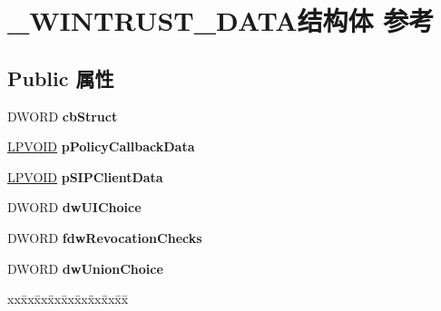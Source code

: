 \hypertarget{struct___w_i_n_t_r_u_s_t___d_a_t_a}{}\section{\+\_\+\+W\+I\+N\+T\+R\+U\+S\+T\+\_\+\+D\+A\+T\+A结构体 参考}
\label{struct___w_i_n_t_r_u_s_t___d_a_t_a}
\subsection*{Public 属性}
\begin{DoxyCompactItemize}
\item 
\mbox{\label{struct___w_i_n_t_r_u_s_t___d_a_t_a_ab690db7308bd57b7aed8d38be6d306ad}} 
D\+W\+O\+RD {\bfseries cb\+Struct}
\item 
\mbox{\label{struct___w_i_n_t_r_u_s_t___d_a_t_a_a285cd2af09955e4edb6ad0fcf12b1e2c}} 
\hyperlink{interfacevoid}{L\+P\+V\+O\+ID} {\bfseries p\+Policy\+Callback\+Data}
\item 
\mbox{\label{struct___w_i_n_t_r_u_s_t___d_a_t_a_ac0873ae3c5c9069b834032cd30585bad}} 
\hyperlink{interfacevoid}{L\+P\+V\+O\+ID} {\bfseries p\+S\+I\+P\+Client\+Data}
\item 
\mbox{\label{struct___w_i_n_t_r_u_s_t___d_a_t_a_afc5dbca73e13116b5df2a94e0e823159}} 
D\+W\+O\+RD {\bfseries dw\+U\+I\+Choice}
\item 
\mbox{\label{struct___w_i_n_t_r_u_s_t___d_a_t_a_aa9a031cf250b23f312bee6152bc4d850}} 
D\+W\+O\+RD {\bfseries fdw\+Revocation\+Checks}
\item 
\mbox{\label{struct___w_i_n_t_r_u_s_t___d_a_t_a_a70f5a4788b2153f6b4cef599c35351d6}} 
D\+W\+O\+RD {\bfseries dw\+Union\+Choice}
\item 
\mbox{\label{struct___w_i_n_t_r_u_s_t___d_a_t_a_a6a588026d64d1433a31adf20750d398f}} 
\begin{tabbing}
xx\=xx\=xx\=xx\=xx\=xx\=xx\=xx\=xx\=\kill

\end{tabbing}
\end{DoxyCompactItemize}
